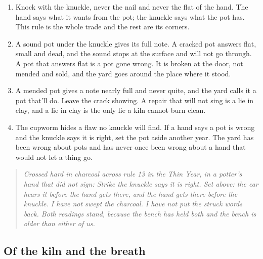 \documentclass{design/chronicle}
\begin{document}
\begin{enumerate}[leftmargin=1.4em,itemsep=1pt,topsep=3pt,parsep=0pt]

\item Knock with the knuckle, never the nail and never the flat of the hand. The hand says what it wants from the pot; the knuckle says what the pot has. This rule is the whole trade and the rest are its corners.

\item A sound pot under the knuckle gives its full note. A cracked pot answers flat, small and dead, and the sound stops at the surface and will not go through. A pot that answers flat is a pot gone wrong. It is broken at the door, not mended and sold, and the yard goes around the place where it stood.

\item A mended pot gives a note nearly full and never quite, and the yard calls it a pot that’ll do. Leave the crack showing. A repair that will not sing is a lie in clay, and a lie in clay is the only lie a kiln cannot burn clean.

\item The cupworm hides a flaw no knuckle will find. If a hand says a pot is wrong and the knuckle says it is right, set the pot aside another year. The yard has been wrong about pots and has never once been wrong about a hand that would not let a thing go.

\end{enumerate}

\begin{quote}\itshape \emph{Crossed hard in charcoal across rule 13 in the Thin Year, in a potter’s hand that did not sign:} Strike \emph{the knuckle says it is right}. Set above: \emph{the ear hears it before the hand gets there, and the hand gets there before the knuckle}. I have not swept the charcoal. I have not put the struck words back. Both readings stand, because the bench has held both and the bench is older than either of us.\end{quote}

\subsection*{Of the kiln and the breath}
\end{document}
